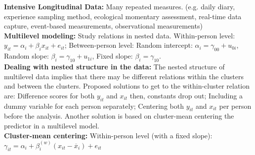 \documentclass[a4paper,7pt,landscape]{extarticle}
\begin{document}
\begin{multicols}{3}
\begin{boxA}
\textbf{Intensive Longitudinal Data:} Many repeated measures. (e.g. daily diary, experience sampling method, ecological momentary assessment, real-time data capture, event-based measurements, observational measurements)\\
\textbf{Multilevel modeling:} Study relations in nested data. Within-person level: $y_{it} = \alpha_i + \beta_i x_{it} + e_{it}$; Between-person level: Random intercept: $\alpha_i = \gamma_{00} + u_{0i}$, Random slope: $\beta_i = \gamma_{10} + u_{1i}$, Fixed slope: $\beta_i = \gamma_{10}$.\\
\textbf{Dealing with nested structure in the data:} The nested structure of multilevel data implies that there may be different relations within the clusters and between the clusters. Proposed solutions to get to the within-cluster relation are: Difference scores for both $y_{it}$ and $x_{it}$ then, constants drop out; Including a dummy variable for each person separately; Centering both $y_{it}$ and $x_{it}$ per person before the analysis. Another solution is based on cluster-mean centering the predictor in a multilevel model.\\
\textbf{Cluster-mean centering:} Within-person level (with a fixed slope): $\gamma_{it} = \alpha_i + \beta_i^{(w)} (x_{it}-\overline{x}_{i}) + e_{it}$\\


\end{boxA}


\end{multicols}
\end{document}
